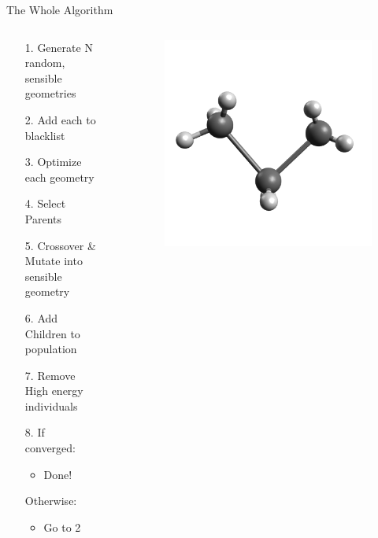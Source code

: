 \documentclass[10pt]{beamer}
\begin{document}
\begin{frame}{The Whole Algorithm}
	\begin{columns}[c] %
		\begin{column}{.48\textwidth}
			\begin{itemize}[<+->]
				\item[1.] {Generate N random, sensible geometries}
				\item[2.] {Add each to blacklist}
				\item[3.] {Optimize each geometry}
				\item[4.] {Select Parents}
				\item[5.] {Crossover \& Mutate into sensible geometry}
				\item[6.] {Add Children to population}
				\item[7.] {Remove High energy individuals}
				\item[8.] {If converged:}
				\begin{itemize}
					\item{Done!}
				\end{itemize}
				\item[] {Otherwise:}
				\begin{itemize}
					\item{Go to 2}
				\end{itemize}
			\end{itemize}
		\end{column}
		\hfill
		\begin{column}{0.48\textwidth}
			\onslide<11>\begin{itemize}
				\item[]{
					\begin{figure}
						\includegraphics[width=0.7\linewidth]{images/sense.png}

\end{figure}}
\end{itemize}
\end{column}
\end{columns}
\end{frame}
\end{document}
